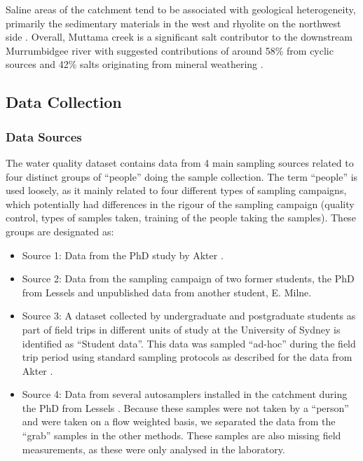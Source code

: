 \documentclass[, manuscript]{copernicus}
\begin{document}
Saline areas of the catchment tend to be associated with geological
heterogeneity, primarily the sedimentary materials in the west and
rhyolite on the northwest side \citep{Conyers2008}. Overall, Muttama
creek is a significant salt contributor to the downstream Murrumbidgee
river with suggested contributions of around 58\% from cyclic sources
and 42\% salts originating from mineral weathering \citep{Conyers2008}.

\subsection{Data Collection}

\subsubsection{Data Sources}

The water quality dataset contains data from 4 main sampling sources
related to four distinct groups of ``people'' doing the sample
collection. The term ``people'' is used loosely, as it mainly related to
four different types of sampling campaigns, which potentially had
differences in the rigour of the sampling campaign (quality control,
types of samples taken, training of the people taking the samples).
These groups are designated as:

\begin{itemize}
\item
  Source 1: Data from the PhD study by Akter \citeyearpar{Akter2018}.
\item
  Source 2: Data from the sampling campaign of two former students, the
  PhD from Lessels \citeyearpar{Lessels2014} and unpublished data from
  another student, E. Milne.
\item
  Source 3: A dataset collected by undergraduate and postgraduate
  students as part of field trips in different units of study at the
  University of Sydney is identified as ``Student data''. This data was
  sampled ``ad-hoc'' during the field trip period using standard
  sampling protocols as described for the data from Akter
  \citeyearpar{Akter2018}.
\item
  Source 4: Data from several autosamplers installed in the catchment
  during the PhD from Lessels \citeyearpar{Lessels2014}. Because these
  samples were not taken by a ``person'' and were taken on a flow
  weighted basis, we separated the data from the ``grab'' samples in the
  other methods. These samples are also missing field measurements, as
  these were only analysed in the laboratory.
\end{itemize}
\end{document}
